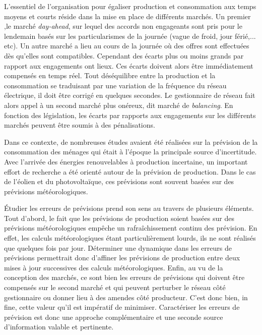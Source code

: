 \documentclass[12pt]{report}
\begin{document}
L'essentiel de l'organisation pour égaliser production et consommation aux temps moyens et courts réside dans la mise en place de différents marchés. Un premier ,le marché \textit{day-ahead}, sur lequel des accords non engageants sont pris pour le lendemain basés sur les particularismes de la journée (vague de froid, jour férié,... etc). Un autre marché a lieu au cours de la journée où des offres sont effectuées dès qu'elles sont compatibles. Cependant des écarts plus ou moins grands par rapport aux engagements ont lieux. Ces écarts doivent alors être immédiatement compensés en temps réel. Tout déséquilibre entre la production et la consommation se traduisant par une variation de la fréquence du réseau électrique, il doit être corrigé en quelques secondes. Le gestionnaire de réseau fait alors appel à un second marché plus onéreux, dit marché de \textit{balancing}. En fonction des législation, les écarts par rapports aux engagements sur les différents marchés peuvent être soumis à des pénalisations.

Dans ce contexte, de nombreuses études avaient été réalisées sur la prévision de la consommation des ménages qui était à l'époque la principale source d'incertitude. Avec l'arrivée des énergies renouvelables à production incertaine, un important effort de recherche a été orienté autour de la prévision de production. Dans le cas de l'éolien et du photovoltaïque, ces prévisions sont souvent basées sur des prévisions météorologiques.

Étudier les erreurs de prévisions prend son sens au travers de plusieurs éléments. Tout d'abord, le fait que les prévisions de production soient basées sur des prévisions météorologiques empêche un rafraîchissement continu des prévision. En effet, les calculs météorologiques étant particulièrement lourds, ils ne sont réalisés que quelques fois par jour. Déterminer une dynamique dans les erreurs de prévisions permettrait donc d'affiner les prévisions de production entre deux mises à jour successives des calculs météorologiques. Enfin, au vu de la conception des marchés, ce sont bien les erreurs de prévisions qui doivent être compensés sur le second marché et qui peuvent perturber le réseau côté gestionnaire ou donner lieu à des amendes côté producteur. C'est donc bien, in fine, cette valeur qu'il est impératif de minimiser. Caractériser les erreurs de prévision est donc une approche complémentaire et une seconde source d'information valable et pertinente.  

\end{document}
